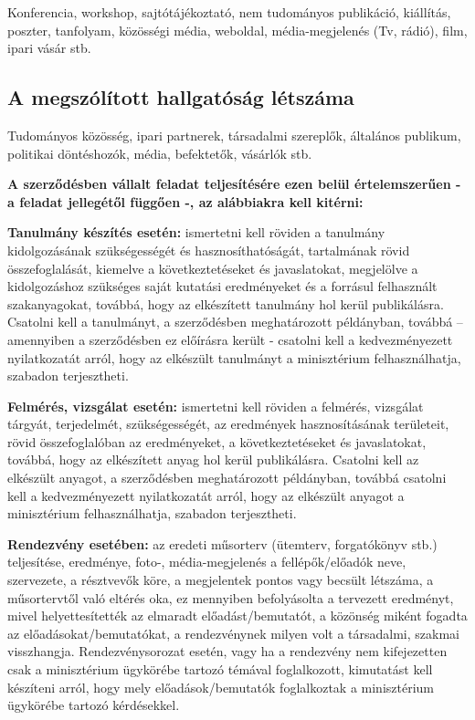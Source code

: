 \documentclass[graybox,envcountchap,sectrefs]{svmono}
\begin{document}
Konferencia, workshop, sajtótájékoztató, nem tudományos publikáció, kiállítás, poszter, tanfolyam, közösségi média, weboldal, média-megjelenés (Tv, rádió), film, ipari vásár stb.

\subsection{A megszólított hallgatóság létszáma}

Tudományos közösség, ipari partnerek, társadalmi szereplők, általános publikum, politikai döntéshozók, média, befektetők, vásárlók stb.

\textbf{A szerződésben vállalt feladat teljesítésére ezen belül értelemszerűen - a feladat jellegétől függően -, az alábbiakra kell kitérni:}

\begin{svgraybox}
	\textbf{Tanulmány készítés esetén:} ismertetni kell röviden a tanulmány kidolgozásának szükségességét és hasznosíthatóságát, tartalmának rövid összefoglalását, kiemelve a következtetéseket és javaslatokat, megjelölve a kidolgozáshoz szükséges saját kutatási eredményeket és a forrásul felhasznált szakanyagokat, továbbá, hogy az elkészített tanulmány hol kerül publikálásra. Csatolni kell a tanulmányt, a szerződésben meghatározott példányban, továbbá – amennyiben a szerződésben ez előírásra került - csatolni kell a kedvezményezett nyilatkozatát arról, hogy az elkészült tanulmányt a minisztérium felhasználhatja, szabadon terjesztheti.
\end{svgraybox}

\begin{svgraybox}
	\textbf{Felmérés, vizsgálat esetén:} ismertetni kell röviden a felmérés, vizsgálat tárgyát, terjedelmét, szükségességét, az eredmények hasznosításának területeit, rövid összefoglalóban az eredményeket, a következtetéseket és javaslatokat, továbbá, hogy az elkészített anyag hol kerül publikálásra. Csatolni kell az elkészült anyagot, a szerződésben meghatározott példányban, továbbá csatolni kell a kedvezményezett nyilatkozatát arról, hogy az elkészült anyagot a minisztérium felhasználhatja, szabadon terjesztheti.
\end{svgraybox}

\begin{svgraybox}
	\textbf{Rendezvény esetében:} az eredeti műsorterv (ütemterv, forgatókönyv stb.) teljesítése, eredménye, foto-, média-megjelenés a fellépők/előadók neve, szervezete, a résztvevők köre, a megjelentek pontos vagy becsült létszáma, a műsortervtől való eltérés oka, ez mennyiben befolyásolta a tervezett eredményt, mivel helyettesítették az elmaradt előadást/bemutatót, a közönség miként fogadta az előadásokat/bemutatókat, a rendezvénynek milyen volt a társadalmi, szakmai visszhangja. Rendezvénysorozat esetén, vagy ha a rendezvény nem kifejezetten csak a minisztérium ügykörébe tartozó témával foglalkozott, kimutatást kell készíteni arról, hogy mely előadások/bemutatók foglalkoztak a minisztérium ügykörébe tartozó kérdésekkel.
\end{svgraybox}
\end{document}
